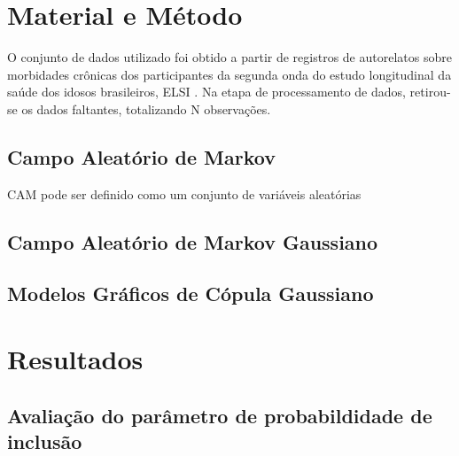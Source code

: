 \documentclass[
  super,
  preprint,
  3p]{elsarticle}
\begin{document}
\section{Material e Método}\label{material-e-muxe9todo}

O conjunto de dados utilizado foi obtido a partir de registros de
autorelatos sobre morbidades crônicas dos participantes da segunda onda
do estudo longitudinal da saúde dos idosos brasileiros, ELSI
\citep{Lima-Costa2018}. Na etapa de processamento de dados, retirou-se
os dados faltantes, totalizando N observações.

\subsection{Campo Aleatório de
Markov}\label{campo-aleatuxf3rio-de-markov}

CAM pode ser definido como um conjunto de variáveis aleatórias

\subsection{Campo Aleatório de Markov
Gaussiano}\label{campo-aleatuxf3rio-de-markov-gaussiano}

\subsection{Modelos Gráficos de Cópula
Gaussiano}\label{modelos-gruxe1ficos-de-cuxf3pula-gaussiano}

\section{Resultados}\label{resultados}

\subsection{Avaliação do parâmetro de probabildidade de
inclusão}\label{avaliauxe7uxe3o-do-paruxe2metro-de-probabildidade-de-inclusuxe3o}


  
\end{document}
